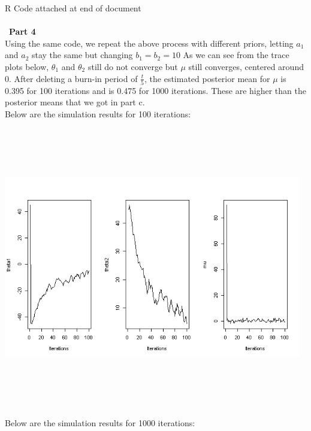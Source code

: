 \documentclass[10pt,a4paper]{article}
\begin{document}
R Code attached at end of document
\text{}\\
\\\
\textbf{Part 4}\\
Using the same code, we repeat the above process with different priors, letting $a_1$ and $a_2$ stay the same but changing $b_1=b_2=10$ As we can see from the trace plots below, $\theta_1$ and $\theta_2$ still do not converge but $\mu$ still converges, centered around 0. After deleting a burn-in period of $\frac{t}{5}$, the estimated posterior mean for $\mu$ is 0.395 for 100 iterations and is 0.475 for 1000 iterations. These are higher than the posterior means that we got in part c. \\
Below are the simulation results for 100 iterations:\\
\includegraphics[width=13cm,height=13cm,keepaspectratio]{./images/p1d_100.png}\\
Below are the simulation results for 1000 iterations:\\
\end{document}

